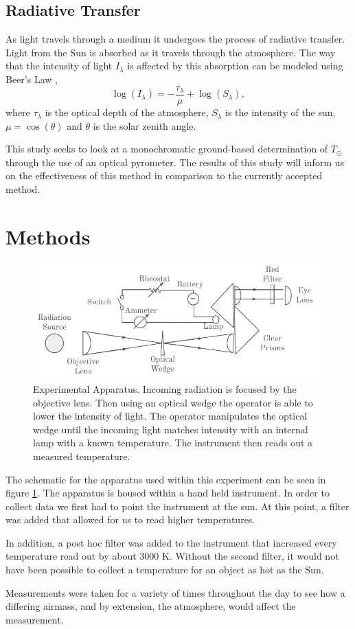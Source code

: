 \documentclass[%
 reprint,
 amsmath,amssymb,
 aps,
 10pt
]{revtex4-2}
\begin{document}
\subsection{Radiative Transfer}
As light travels through a medium it undergoes the process of radiative transfer. Light from the Sun is absorbed as it travels through the atmosphere. The way that the intensity of light $I_\lambda$ is affected by this absorption can be modeled using Beer's Law \citep{petty_first_2006},
\begin{equation}
	\log{(I_\lambda)} = -\frac{\tau_\lambda}{\mu}+\log{(S_\lambda)},
	\label{beers law}
\end{equation}
where $\tau_\lambda$ is the optical depth of the atmosphere, $S_\lambda$ is the intensity of the sun, $\mu = \cos(\theta)$ and $\theta$ is the solar zenith angle.
\par
This study seeks to look at a monochromatic ground-based determination of $T_\odot$ through the use of an optical pyrometer. The results of this study will inform us on the effectiveness of this method in comparison to the currently accepted method.
\section{Methods}\label{methods}
\begin{figure}
	\includegraphics{setup.pdf}
	\caption{\label{app} Experimental Apparatus.
	Incoming radiation is focused by the objective lens. Then using an optical wedge the operator is able to lower the intensity of light. The operator manipulates the optical wedge until the incoming light matches intensity with an internal lamp with a known temperature. The instrument then reads out a measured temperature.
	}
\end{figure}
The schematic for the apparatus used within this experiment can be seen in figure \ref{app}. The apparatus is housed within a hand held instrument. In order to collect data we first had to point the instrument at the sun. At this point, a filter was added that allowed for us to read higher temperatures.
\par
In addition, a post hoc filter was added to the instrument that increased every temperature read out by about 3000 K. Without the second filter, it would not have been possible to collect a temperature for an object as hot as the Sun. 
\par
Measurements were taken for a variety of times throughout the day to see how a differing airmass, and by extension, the atmosphere, would affect the measurement.
\end{document}
